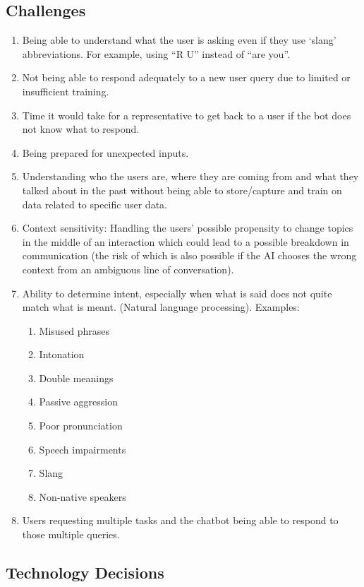 \documentclass[11pt]{article}
\begin{document}
\subsection{Challenges}
\begin{enumerate}
	\item Being able to understand what the user is asking even if they use ‘slang’ abbreviations.  For example, using “R U” instead of “are you”.
	\item Not being able to respond adequately to a new user query due to limited or insufficient  training.
	\item Time it would take for a representative to get back to a user if the bot does not know what to respond.
	\item Being prepared for unexpected inputs.
	\item Understanding who the users are, where they are coming from and what they talked about in the past without being able to store/capture and train on data related to specific user data.
	\item Context sensitivity: Handling the users’ possible propensity to change topics in the middle of an interaction which could lead to a possible breakdown in communication (the risk of which is also possible if the AI chooses the wrong context from an ambiguous line of 	conversation).
	\item Ability to determine intent, especially when what is said does not quite match what is meant. (Natural language processing).  Examples:
	\begin{enumerate}
		\item Misused phrases
		\item Intonation
		\item Double meanings
		\item Passive aggression
		\item Poor pronunciation
		\item Speech impairments
		\item Slang
		\item Non-native speakers
	\end{enumerate}
	\item Users requesting multiple tasks and the chatbot being able to respond to those multiple queries.
\end{enumerate}

\subsection{Technology Decisions}
\end{document}
